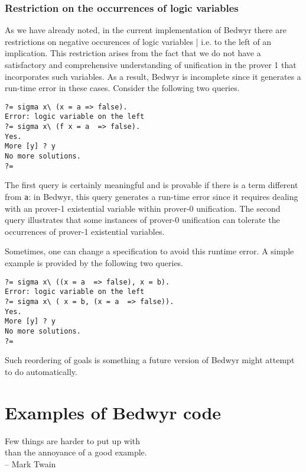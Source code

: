 \documentclass{article}
\begin{document}
\subsubsection{Restriction on the occurrences of logic variables}
\label{restrict-logic-variables}

As we have already noted, in the current implementation of Bedwyr
there are restrictions on negative occurences of logic variables |
i.e. to the left of an implication.
This restriction arises from the fact that we do not
have a satisfactory and comprehensive understanding of unification in
the prover 1 that incorporates such variables.  As a result, Bedwyr
is incomplete since it generates a run-time error in these cases.
Consider the following two queries.
\begin{verbatim}
?= sigma x\ (x = a => false).
Error: logic variable on the left
?= sigma x\ (f x = a  => false).
Yes.
More [y] ? y
No more solutions.
?=
\end{verbatim}
The first query is certainly meaningful and is provable if there is a
term different from {\tt a}: in Bedwyr, this query generates a
run-time error since it requires dealing with an prover-1
existential variable within prover-0 unification. The second query illustrates
that some instances of prover-0 unification can tolerate the
occurrences of prover-1 existential variables.

Sometimes, one can change a specification to avoid this runtime
error.  A simple example is provided by the following two queries.
\begin{verbatim}
?= sigma x\ ((x = a  => false), x = b).
Error: logic variable on the left
?= sigma x\ ( x = b, (x = a  => false)).
Yes.
More [y] ? y
No more solutions.
?=
\end{verbatim}
Such reordering of goals is something a future version of Bedwyr might
attempt to do automatically.

\section{Examples of Bedwyr code}

\begin{flushright}
Few things are harder to put up with \\
than the annoyance of a good example. \\ -- Mark Twain
\end{flushright}
\end{document}
